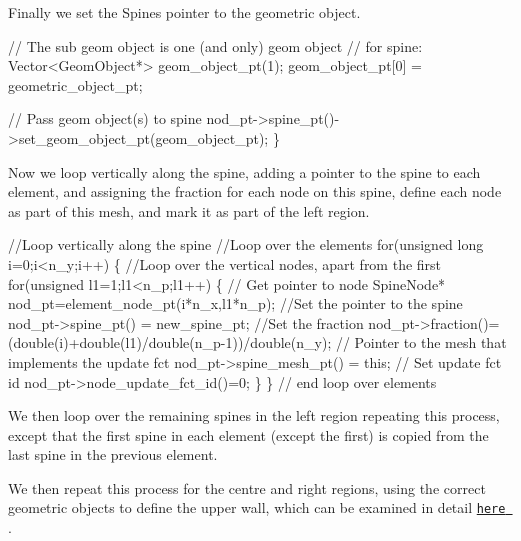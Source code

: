 Finally we set the Spines\textquotesingle{} pointer to the geometric object.


\begin{DoxyCodeInclude}
  
  \textcolor{comment}{// The sub geom object is one (and only) geom object}
  \textcolor{comment}{// for spine:}
  Vector<GeomObject*> geom\_object\_pt(1);
  geom\_object\_pt[0] = geometric\_object\_pt;
  
  \textcolor{comment}{// Pass geom object(s) to spine}
  nod\_pt->spine\_pt()->set\_geom\_object\_pt(geom\_object\_pt);
 \}

\end{DoxyCodeInclude}


Now we loop vertically along the spine, adding a pointer to the spine to each element, and assigning the fraction for each node on this spine, define each node as part of this mesh, and mark it as part of the left region.


\begin{DoxyCodeInclude}

 \textcolor{comment}{//Loop vertically along the spine}
 \textcolor{comment}{//Loop over the elements }
 \textcolor{keywordflow}{for}(\textcolor{keywordtype}{unsigned} \textcolor{keywordtype}{long} i=0;i<n\_y;i++)
  \{
   \textcolor{comment}{//Loop over the vertical nodes, apart from the first}
   \textcolor{keywordflow}{for}(\textcolor{keywordtype}{unsigned} l1=1;l1<n\_p;l1++)
    \{
     \textcolor{comment}{// Get pointer to node}
     SpineNode* nod\_pt=element\_node\_pt(i*n\_x,l1*n\_p);
     \textcolor{comment}{//Set the pointer to the spine}
     nod\_pt->spine\_pt() = new\_spine\_pt;
     \textcolor{comment}{//Set the fraction}
     nod\_pt->fraction()=(double(i)+double(l1)/double(n\_p-1))/\textcolor{keywordtype}{double}(n\_y);
     \textcolor{comment}{// Pointer to the mesh that implements the update fct}
     nod\_pt->spine\_mesh\_pt() = \textcolor{keyword}{this}; 
     \textcolor{comment}{// Set update fct id}
     nod\_pt->node\_update\_fct\_id()=0;
    \}
  \} \textcolor{comment}{// end loop over elements}

\end{DoxyCodeInclude}


We then loop over the remaining spines in the left region repeating this process, except that the first spine in each element (except the first) is copied from the last spine in the previous element.

We then repeat this process for the centre and right regions, using the correct geometric objects to define the upper wall, which can be examined in detail \href{../../../the_data_structure/html/classoomph_1_1ChannelSpineMesh.html}{\tt here }.



